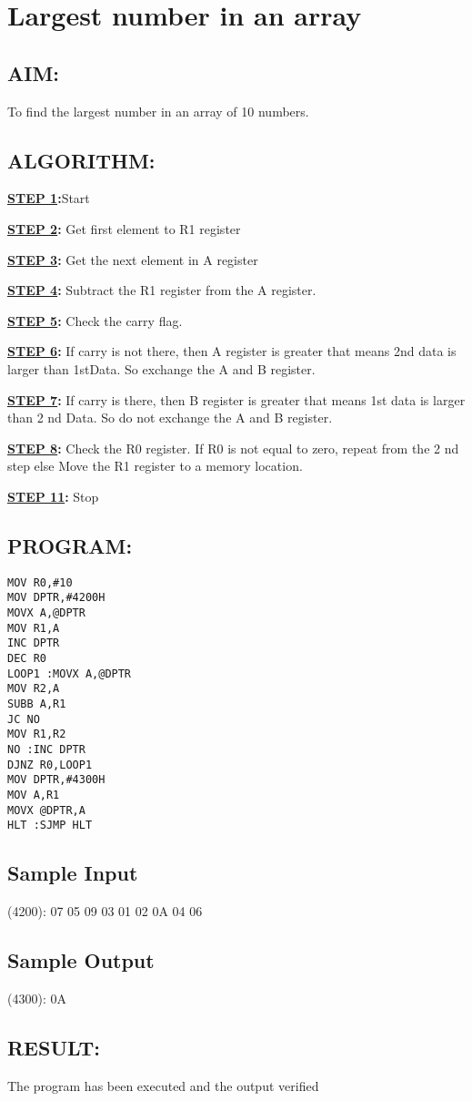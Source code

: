 \chapter*{ Largest number in an array}
%
%
%
%
\section*{AIM:}
To find the largest number in an array of 10 numbers.

\section*{ALGORITHM:}
\textbf{\underline{STEP 1}:}Start

\textbf{\underline{STEP 2}:} Get first element to R1 register

\textbf{\underline{STEP 3}:}  Get the next element in A register

\textbf{\underline{STEP 4}:} Subtract the R1 register from the A register.

\textbf{\underline{STEP 5}:}  Check the carry flag.

\textbf{\underline{STEP 6}:} If carry is not there, then A register is greater that means 2nd data is larger than
1stData. So exchange the A and B register.

\textbf{\underline{STEP 7}:}  If carry is there, then B register is greater that means 1st data is larger than 2
nd Data. So do not exchange the A and B register.

\textbf{\underline{STEP 8}:}  Check the R0 register. If R0 is not equal to zero, repeat from the 2
nd step else Move the R1 register to a memory location.

\textbf{\underline{STEP 11}:} Stop


\section*{PROGRAM:}

\begin{lstlisting}
MOV R0,#10
MOV DPTR,#4200H
MOVX A,@DPTR
MOV R1,A
INC DPTR
DEC R0
LOOP1 :MOVX A,@DPTR
MOV R2,A
SUBB A,R1
JC NO
MOV R1,R2
NO :INC DPTR
DJNZ R0,LOOP1
MOV DPTR,#4300H
MOV A,R1
MOVX @DPTR,A
HLT :SJMP HLT
\end{lstlisting}

\section*{Sample Input}
(4200): 07 05 09 03 01 02 0A 04 06

\section*{Sample Output}
(4300): 0A

\section*{RESULT:}
The program has been executed and the output verified
%
%
%
%
